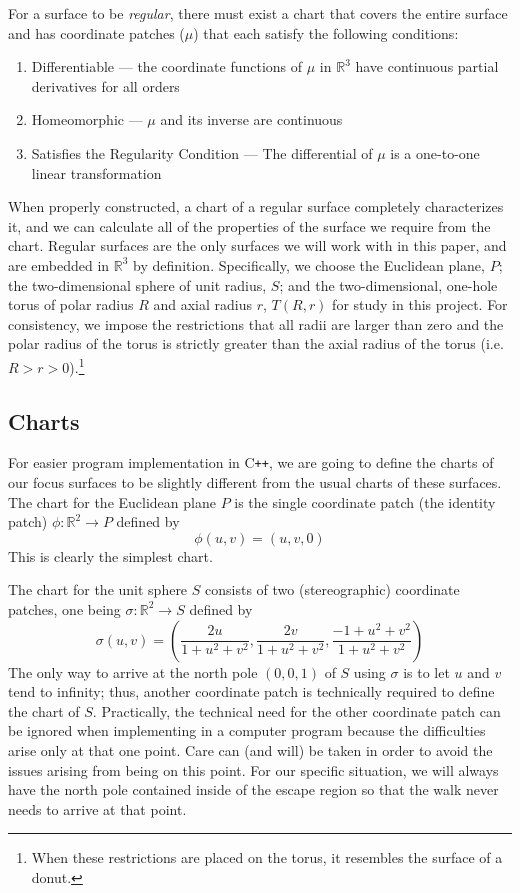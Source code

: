\documentclass[12pt]{article}
\newcommand{\R}{\mathbb{R}}
\begin{document}
		For a surface to be \emph{regular}, there must exist a chart that covers the entire surface and has coordinate patches ($\mu$) that each satisfy the following conditions:
		\begin{enumerate}
			\item Differentiable --- the coordinate functions of $\mu$ in $\R^3$ have continuous partial derivatives for all orders
			\item Homeomorphic --- $\mu$ and its inverse are continuous
			\item Satisfies the Regularity Condition --- The differential of $\mu$ is a one-to-one linear transformation
		\end{enumerate}
		When properly constructed, a chart of a regular surface completely characterizes it, and we can calculate all of the properties of the surface we require from the chart.
		Regular surfaces are the only surfaces we will work with in this paper, and are embedded in $\R^3$ by definition.
		Specifically, we choose the Euclidean plane, $P$; the two-dimensional sphere of unit radius, $S$; and the two-dimensional, one-hole torus of polar radius $R$ and axial radius $r$, $T(R,r)$ for study in this project.
		For consistency, we impose the restrictions that all radii are larger than zero and the polar radius of the torus is strictly greater than the axial radius of the torus (i.e. $R > r > 0$).\footnote{
			When these restrictions are placed on the torus, it resembles the surface of a donut.
			}
	
	\subsection{Charts}
		For easier program implementation in C\texttt{++}, we are going to define the charts of our focus surfaces to be slightly different from the usual charts of these surfaces.
		The chart for the Euclidean plane $P$ is the single coordinate patch (the identity patch) $\phi: \R^2 \to P$ defined by
		$$ \phi(u,v) = ( u , v , 0 ) $$
		This is clearly the simplest chart.
		
		The chart for the unit sphere $S$ consists of two (stereographic) coordinate patches, one being $\sigma:\R^2 \to S$ defined by
		$$ \sigma(u,v) = \left( \frac{2u}{1+u^2+v^2} , \frac{2v}{1+u^2+v^2} , \frac{-1+u^2+v^2}{1+u^2+v^2} \right) $$
		The only way to arrive at the north pole $(0,0,1)$ of $S$ using $\sigma$ is to let $u$ and $v$ tend to infinity; thus, another coordinate patch is technically required to define the chart of $S$.
		Practically, the technical need for the other coordinate patch can be ignored when implementing in a computer program because the difficulties arise only at that one point.
		Care can (and will) be taken in order to avoid the issues arising from being on this point.
		For our specific situation, we will always have the north pole contained inside of the escape region so that the walk never needs to arrive at that point. 
		
\end{document}
